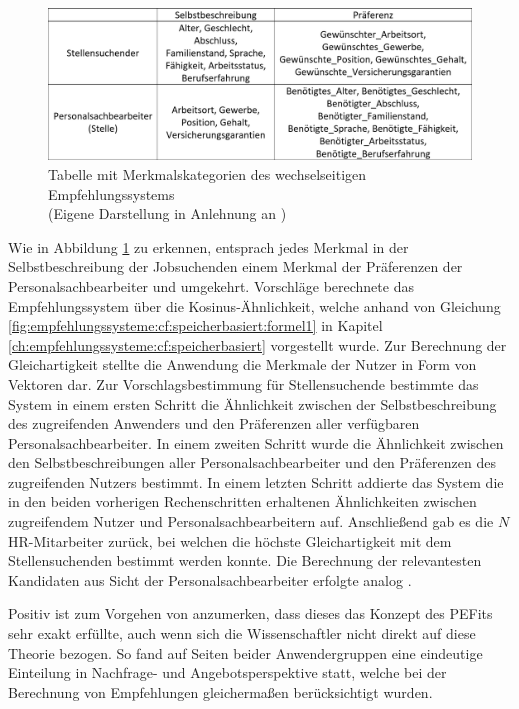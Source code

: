 \begin{figure}[h]
	\centering
	\includegraphics[width=1\textwidth]{gfx/hong-tabelle.png}
	\caption[Tabelle mit Merkmalskategorien des wechselseitigen Empfehlungssystems]{Tabelle mit Merkmalskategorien des wechselseitigen Empfehlungssystems\\
	(Eigene Darstellung in Anlehnung an \cite[S. 2]{wenxing:2015})}
	\label{fig:verwandteArbeiten:nichtAufDemPEFitBasierendeBilateraleSysteme:abb1}
\end{figure}

Wie in Abbildung \ref{fig:verwandteArbeiten:nichtAufDemPEFitBasierendeBilateraleSysteme:abb1} zu erkennen, entsprach jedes Merkmal in der Selbstbeschreibung der Jobsuchenden einem Merkmal der Präferenzen der Personalsachbearbeiter und umgekehrt. Vorschläge berechnete das Empfehlungssystem über die Kosinus-Ähnlichkeit, welche anhand von Gleichung \ref{fig:empfehlungssysteme:cf:speicherbasiert:formel1} in Kapitel \ref{ch:empfehlungssysteme:cf:speicherbasiert} vorgestellt wurde. Zur Berechnung der Gleichartigkeit stellte die Anwendung die Merkmale der Nutzer in Form von Vektoren dar. Zur Vorschlagsbestimmung für Stellensuchende bestimmte das System in einem ersten Schritt die Ähnlichkeit zwischen der Selbstbeschreibung des zugreifenden Anwenders und den Präferenzen aller verfügbaren Personalsachbearbeiter. In einem zweiten Schritt wurde die Ähnlichkeit zwischen den Selbstbeschreibungen aller Personalsachbearbeiter und den Präferenzen des zugreifenden Nutzers bestimmt. In einem letzten Schritt addierte das System die in den beiden vorherigen Rechenschritten erhaltenen Ähnlichkeiten zwischen zugreifendem Nutzer und Personalsachbearbeitern auf. Anschließend gab es die $N$ HR-Mitarbeiter zurück, bei welchen die höchste Gleichartigkeit mit dem Stellensuchenden bestimmt werden konnte. Die Berechnung der relevantesten Kandidaten aus Sicht der Personalsachbearbeiter erfolgte analog \cite[S. 2f.]{wenxing:2015}.

Positiv ist zum Vorgehen von \textcite[S. 1ff.]{wenxing:2015} anzumerken, dass dieses das Konzept des \acp{PEFit} sehr exakt erfüllte, auch wenn sich die Wissenschaftler nicht direkt auf diese Theorie bezogen. So fand auf Seiten beider Anwendergruppen eine eindeutige Einteilung in Nachfrage- und Angebotsperspektive statt, welche bei der Berechnung von Empfehlungen gleichermaßen berücksichtigt wurden.

